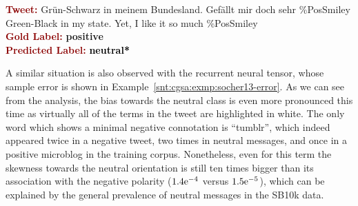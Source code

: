 \begin{example}\label{snt:cgsa:exmp:rae-error}
  \noindent\textup{\bfseries\textcolor{darkred}{Tweet:}} {\upshape
    \colorbox{white!5}{Gr\"un}\colorbox{blue!11}{-}\colorbox{white!25.7}{Schwarz}
    \colorbox{white!5}{in} \colorbox{white!2.5!blue!1}{meinem}
    Bundesland. \colorbox{green!10}{Gef\"allt}
    \colorbox{white!5!blue!4.5}{mir} \colorbox{white!5!blue!5}{doch}
    \colorbox{white!4.6!blue!5}{sehr}
    \colorbox{white!5!blue!5}{\%PosSmiley}}\\
  \noindent \colorbox{white!5}{Green}\colorbox{blue!11}{-}\colorbox{white!25.7}{Black} \colorbox{white!5}{in} \colorbox{white!2.5!blue!1}{my} state.  \colorbox{white!5!blue!5}{Yet}, \colorbox{white!5!blue!4.5}{I} \colorbox{green!10}{like} it \colorbox{white!4.6!blue!5}{so much} \colorbox{white!5!blue!5}{\%PosSmiley}\\[\exampleSep]
  \noindent\textup{\bfseries\textcolor{darkred}{Gold Label:}}\hspace*{4.3em}\textbf{%
    \upshape\textcolor{green3}{positive}}\\
 \noindent\textup{\bfseries\textcolor{darkred}{Predicted Label:}}\hspace*{2em}\textbf{%
    \upshape\textcolor{black}{neutral*}}
\end{example}

A similar situation is also observed with the recurrent neural tensor,
whose sample error is shown in
Example~\ref{snt:cgsa:exmp:socher13-error}.  As we can see from the
analysis, the bias towards the neutral class is even more pronounced
this time as virtually all of the terms in the tweet are highlighted
in white.  The only word which shows a minimal negative connotation is
``tumblr'', which indeed appeared twice in a negative tweet, two times
in neutral messages, and once in a positive microblog in the training
corpus.  Nonetheless, even for this term the skewness towards the
neutral orientation is still ten times bigger than its association
with the negative polarity (${1.4}\mathrm{e}^{-4}$ versus
${1.5}\mathrm{e}^{-5}$), which can be explained by the general
prevalence of neutral messages in the SB10k data.

